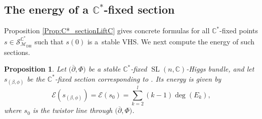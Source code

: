 \documentclass[pdftex]{sigma}
\numberwithin{equation}{section}
\newtheorem{Proposition}[Theorem]{Proposition}
\theoremstyle{definition}
\newcommand\C{{\mathbb C}}
\begin{document}
\subsection[The energy of a C\^{}*-fixed section]{The energy of a $\boldsymbol{\C^*}$-fixed section}

Proposition \ref{Prop:C*_sectionLiftC} gives concrete formulas for all $\C^*$-fixed points
$s \in \mathcal{S}_{\mathcal{M}_{\mathrm{DH}}}^{\C^*}$ such that $s(0)$ is a~stable VHS.
We next compute the energy of such sections.

\begin{Proposition}\label{Prop: energyC*-fixed_sections}
Let $\bigl({\overline{\partial}}, \Phi\bigr)$ be a stable $\C^*$-fixed $\operatorname{SL}(n,\C)$-Higgs bundle, and let $s_{(\beta,\phi)}$
be the $\C^*$-fixed section corresponding to .
Its energy is given by
\[
\mathcal{E}(s_{(\beta,\phi)}) = \mathcal{E}(s_0) = \sum_{k=2}^l(k-1)\deg(E_k),
\]
where $s_0$ is the twistor line through $\bigl({\overline{\partial}}, \Phi\bigr)$.
\end{Proposition}
\end{document}
